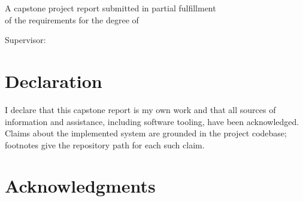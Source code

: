 \begin{titlepage}
  \centering
  \vspace*{1.5cm}

  {\large \reportinstitution\par}
  \vspace{0.4cm}
  {\large \reportprogram\par}

  \vspace{3cm}

  {\LARGE\bfseries \reporttitle\par}

  \vspace{1cm}
  {\large A capstone project report submitted in partial fulfillment\\
  of the requirements for the degree of\\[0.3em]
  \reportdegree\par}

  \vspace{3cm}

  {\large\bfseries \reportauthor\par}
  \vspace{0.5cm}
  {\large Supervisor: \reportsupervisor\par}

  \vfill

  {\large \reportdate\par}
  \vspace{1cm}
\end{titlepage}

\chapter*{Declaration}
I declare that this capstone report is my own work and that all sources of
information and assistance, including software tooling, have been
acknowledged. Claims about the implemented system are grounded in the project
codebase; footnotes give the repository path for each such claim.

\chapter*{Acknowledgments}
\clearpage
